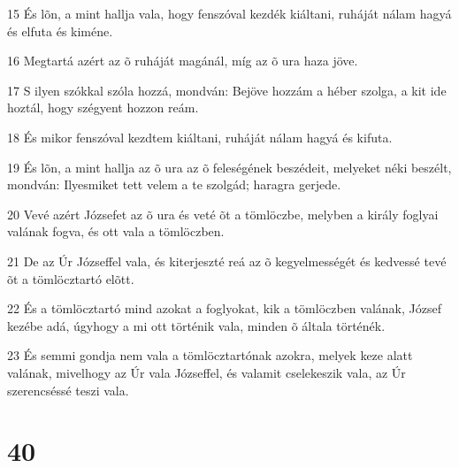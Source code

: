 \par 15 És lõn, a mint hallja vala, hogy fenszóval kezdék kiáltani, ruháját nálam hagyá és elfuta és kiméne.
\par 16 Megtartá azért az õ ruháját magánál, míg az õ ura haza jöve.
\par 17 S ilyen szókkal szóla hozzá, mondván: Bejöve hozzám a héber szolga, a kit ide hoztál, hogy szégyent hozzon reám.
\par 18 És mikor fenszóval kezdtem kiáltani, ruháját nálam hagyá és kifuta.
\par 19 És lõn, a mint hallja az õ ura az õ feleségének beszédeit, melyeket néki beszélt, mondván: Ilyesmiket tett velem a te szolgád; haragra gerjede.
\par 20 Vevé azért Józsefet az õ ura és veté õt a tömlöczbe, melyben a király foglyai valának fogva, és ott vala a tömlöczben.
\par 21 De az Úr Józseffel vala, és kiterjeszté reá az õ kegyelmességét és kedvessé tevé õt a tömlöcztartó elõtt.
\par 22 És a tömlöcztartó mind azokat a foglyokat, kik a tömlöczben valának, József kezébe adá, úgyhogy a mi ott történik vala, minden õ általa történék.
\par 23 És semmi gondja nem vala a tömlöcztartónak azokra, melyek keze alatt valának, mivelhogy az Úr vala Józseffel, és valamit cselekeszik vala, az Úr szerencséssé teszi vala.

\chapter{40}

